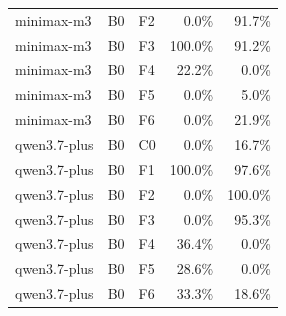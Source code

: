 \begin{tabular}{lllrr}
minimax-m3 & B0 & F2 & 0.0\% & 91.7\% \\
minimax-m3 & B0 & F3 & 100.0\% & 91.2\% \\
minimax-m3 & B0 & F4 & 22.2\% & 0.0\% \\
minimax-m3 & B0 & F5 & 0.0\% & 5.0\% \\
minimax-m3 & B0 & F6 & 0.0\% & 21.9\% \\
qwen3.7-plus & B0 & C0 & 0.0\% & 16.7\% \\
qwen3.7-plus & B0 & F1 & 100.0\% & 97.6\% \\
qwen3.7-plus & B0 & F2 & 0.0\% & 100.0\% \\
qwen3.7-plus & B0 & F3 & 0.0\% & 95.3\% \\
qwen3.7-plus & B0 & F4 & 36.4\% & 0.0\% \\
qwen3.7-plus & B0 & F5 & 28.6\% & 0.0\% \\
qwen3.7-plus & B0 & F6 & 33.3\% & 18.6\% \\
\bottomrule
\end{tabular}
